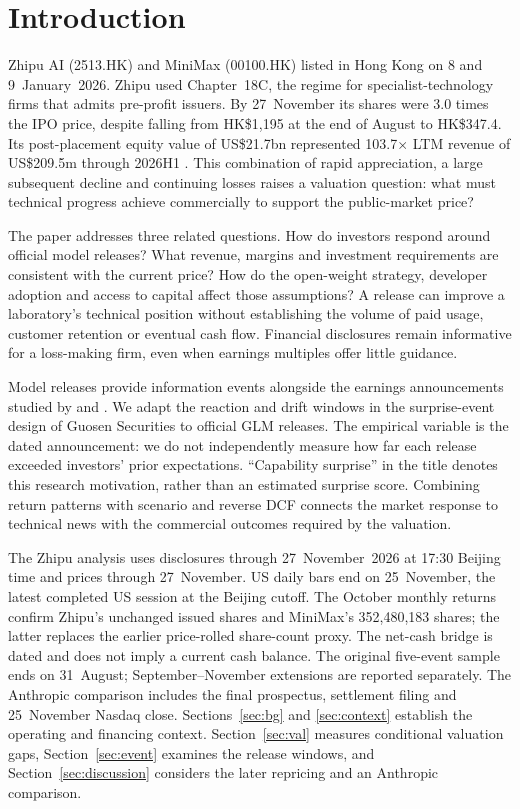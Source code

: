 \documentclass[11pt]{article}
\begin{document}
\section{Introduction}
Zhipu AI (2513.HK) and MiniMax (00100.HK) listed in Hong Kong on 8 and 9~January~2026. Zhipu used Chapter~18C, the regime for specialist-technology firms that admits pre-profit issuers. By 27~November its shares were 3.0 times the IPO price, despite falling from HK\$1,195 at the end of August to HK\$347.4. Its post-placement equity value of US\$21.7bn represented 103.7$\times$ LTM revenue of US\$209.5m through 2026H1 \citep{etnetnov2026,prospectus2513,prospectus100,placement2513}. This combination of rapid appreciation, a large subsequent decline and continuing losses raises a valuation question: what must technical progress achieve commercially to support the public-market price?

The paper addresses three related questions. How do investors respond around official model releases? What revenue, margins and investment requirements are consistent with the current price? How do the open-weight strategy, developer adoption and access to capital affect those assumptions? A release can improve a laboratory's technical position without establishing the volume of paid usage, customer retention or eventual cash flow. Financial disclosures remain informative for a loss-making firm, even when earnings multiples offer little guidance.

Model releases provide information events alongside the earnings announcements studied by \citet{ball1968} and \citet{bernard1989}. We adapt the reaction and drift windows in the surprise-event design of Guosen Securities \citep{guosen2020} to official GLM releases. The empirical variable is the dated announcement: we do not independently measure how far each release exceeded investors' prior expectations. ``Capability surprise'' in the title denotes this research motivation, rather than an estimated surprise score. Combining return patterns with scenario and reverse DCF connects the market response to technical news with the commercial outcomes required by the valuation.

The Zhipu analysis uses disclosures through 27~November~2026 at 17:30 Beijing time and prices through 27~November. US daily bars end on 25~November, the latest completed US session at the Beijing cutoff. The October monthly returns confirm Zhipu's unchanged issued shares and MiniMax's 352,480,183 shares; the latter replaces the earlier price-rolled share-count proxy. The net-cash bridge is dated and does not imply a current cash balance. The original five-event sample ends on 31~August; September--November extensions are reported separately. The Anthropic comparison includes the final prospectus, settlement filing and 25~November Nasdaq close. Sections~\ref{sec:bg} and \ref{sec:context} establish the operating and financing context. Section~\ref{sec:val} measures conditional valuation gaps, Section~\ref{sec:event} examines the release windows, and Section~\ref{sec:discussion} considers the later repricing and an Anthropic comparison.
\end{document}
